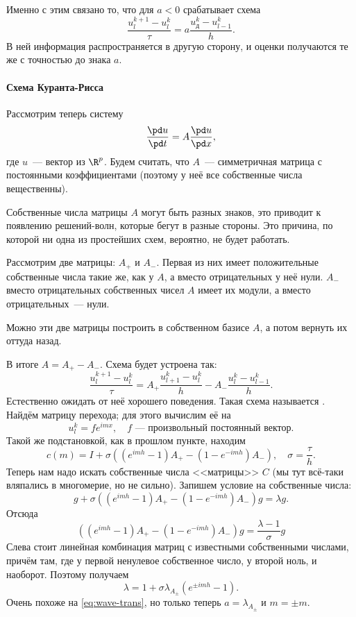\documentclass{trlnotes}
\begin{document}
Именно с этим связано то, что для $a < 0$ срабатывает схема
\[
	\dfrac{u^{k + 1}_l - u^k_l}{\tau} = a \dfrac{u^k_{д} - u^k_{l-1}}{h}.
\]
В ней информация распространяется в другую сторону, и оценки получаются те же с точностью до знака $a$.

\paragraph{Схема Куранта-Рисса}

Рассмотрим теперь систему
\[
	\dfrac{\pd u}{\pd t} = A \dfrac{\pd u}{\pd x},
\]
где $u$~--- вектор из $\R^p$. Будем считать, что $A$~--- симметричная матрица с постоянными коэффициентами (поэтому у неё все собственные числа вещественны).

Собственные числа матрицы $A$ могут быть разных знаков, это приводит к появлению решений-волн, которые бегут в разные стороны. Это причина, по которой ни одна из простейших схем, вероятно, не будет работать.

Рассмотрим две матрицы: $A_+$ и $A_-$. Первая из них имеет положительные собственные числа такие же, как у $A$, а вместо отрицательных у неё нули. $A_-$ вместо отрицательных собственных чисел $A$ имеет их модули, а вместо отрицательных~--- нули. 

\begin{rem}
	Можно эти две матрицы построить в собственном базисе $A$, а потом вернуть их оттуда назад.
\end{rem}

В итоге $A = A_+ - A_-$. Схема будет устроена так:
\[
	\dfrac{u_l^{k+1} - u_l^k}{\tau} = A_+ \dfrac{u^k_{l + 1} - u^k_l}{h}  - A_- \dfrac{u_l^k - u^k_{l-1}}{h}.
\]
Естественно ожидать от неё хорошего поведения. Такая схема называется . Найдём матрицу перехода; для этого вычислим её на
\[
	u_l^k = fe^{imx}, \quad f \text{~--- произвольный постоянный вектор.}
\]
Такой же подстановкой, как в прошлом пункте, находим
\[
	c(m) = I + \sigma \left((e^{imh} - 1)A_+ - (1 - e^{-imh}) A_-\right), \quad \sigma = \dfrac{\tau}{h}.
\]
Теперь нам надо искать собственные числа <<матрицы>> $C$ (мы тут всё-таки вляпались в многомерие, но не сильно). Запишем условие на собственные числа:
\[
	g + \sigma \left((e^{imh} - 1)A_+ - (1 - e^{-imh})A_- \right)g = \lambda g.
\]
Отсюда
\[
	\left((e^{imh} - 1)A_+ - (1 - e^{-imh})A_- \right)g = \dfrac{\lambda - 1}{\sigma} g
\]
Слева стоит линейная комбинация матриц с известными собственными числами, причём там, где у первой ненулевое собственное число, у второй ноль, и наоборот. Поэтому получаем
\[
	\lambda = 1 + \sigma \lambda_{A_{\pm}} (e^{\pm imh} - 1).
\]
Очень похоже на \ref{eq:wave-trans}, но только теперь $a = \lambda_{A_{\pm}}$ и $m = \pm m$.
\end{document}
